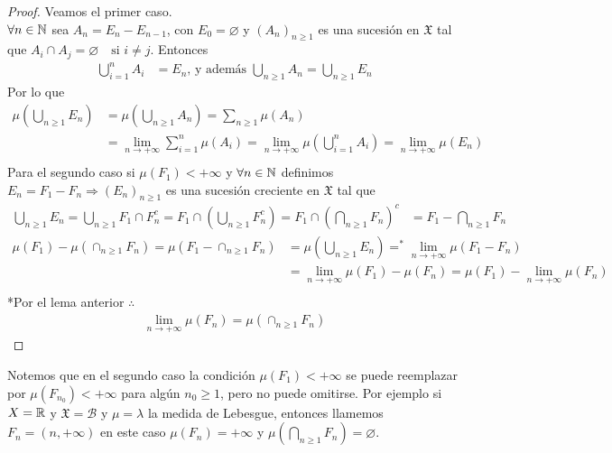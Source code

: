 \begin{lemma}
    \begin{proof}
        Veamos el primer caso. \\
        $\forall n \in \mathbb{N}$ sea $A_n = E_n - E_{n - 1}$, con $E_0 = \varnothing$ y $(A_n)_{n \geq 1}$ es una sucesión en $\mathfrak{X}$ tal que $A_i \cap A_j = \varnothing \quad \text{si } i \neq j$.
        Entonces \begin{align*}
            \bigcup_{i = 1}^n A_i & = E_n \text{, y además } \bigcup_{n \geq 1} A_n = \bigcup_{n \geq 1} E_n
        \end{align*}
        Por lo que \begin{align*}
            \mu(\bigcup_{n \geq 1} E_n) & = \mu(\bigcup_{n \geq 1} A_n) = \sum_{n \geq 1} \mu(A_n)                                                                          \\
                                        & = \lim_{n \to +\infty} \sum_{i = 1}^n \mu(A_i) = \lim_{n \to +\infty} \mu(\bigcup_{i = 1}^n A_i)  = \lim_{n \to +\infty} \mu(E_n) \\
        \end{align*}
        Para el segundo caso si $\mu(F_1) < +\infty$ y $\forall n \in \mathbb{N}$ definimos $E_n = F_1 - F_n \Rightarrow (E_n)_{n \geq 1}$ es una sucesión creciente en $\mathfrak{X}$ tal que \begin{align*}
            \bigcup_{n \geq 1} E_n = \bigcup_{n \geq 1} F_1 \cap F_n^c = F_1 \cap (\bigcup_{n \geq 1} F_n^c) = F_1 \cap (\bigcap_{n \geq 1} F_n)^c & = F_1 - \bigcap_{n \geq 1} F_n
        \end{align*}
        \begin{align*}
            \mu(F_1) - \mu(\cap_{n \geq 1} F_n) = \mu(F_1 - \cap_{n \geq 1} F_n) & = \mu(\bigcup_{n \geq 1} E_n) =^{*} \lim_{n \to +\infty} \mu(F_1 - F_n)               \\
                                                                                 & = \lim_{n \to +\infty} \mu(F_1) - \mu(F_n) = \mu(F_1) - \lim_{n \to +\infty} \mu(F_n) \\
        \end{align*}
        *Por el lema anterior $ \therefore $ \begin{align*}
            \lim_{n \to +\infty} \mu(F_n) = \mu(\cap_{n \geq 1} F_n)
        \end{align*}
    \end{proof}
\end{lemma}

\clearpage

Notemos que en el segundo caso la condición $\mu(F_1) < +\infty$ se puede reemplazar por $\mu(F_{n_0}) < +\infty$ para algún $n_0 \geq 1$, pero no puede omitirse.
Por ejemplo si $X = \mathbb{R}$ y $\mathfrak{X} = \mathcal{B}$ y $\mu = \lambda$ la medida de Lebesgue, entonces llamemos $F_n = (n, +\infty)$ en este caso
$\mu(F_n) = +\infty$ y $\mu(\bigcap_{n \geq 1} F_n) = \varnothing$.

